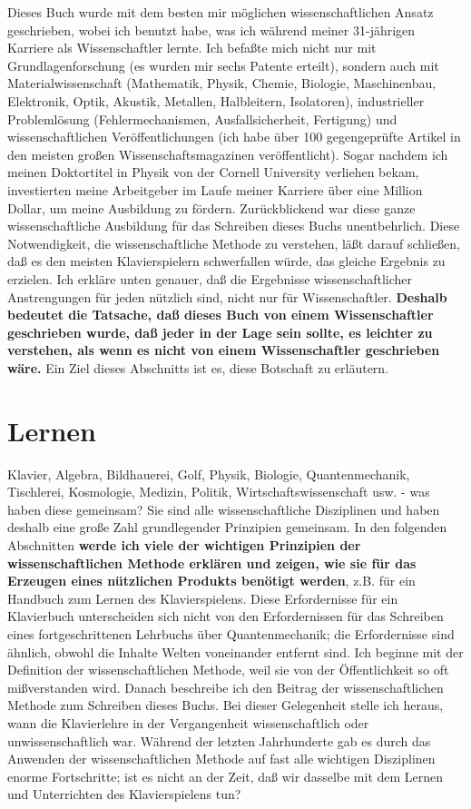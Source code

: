Dieses Buch wurde mit dem besten mir möglichen wissenschaftlichen Ansatz geschrieben, wobei ich benutzt habe, was ich während meiner 31-jährigen Karriere als Wissenschaftler lernte.
Ich befaßte mich nicht nur mit Grundlagenforschung (es wurden mir sechs Patente erteilt), sondern auch mit Materialwissenschaft (Mathematik, Physik, Chemie, Biologie, Maschinenbau, Elektronik, Optik, Akustik, Metallen, Halbleitern, Isolatoren), industrieller Problemlösung (Fehlermechanismen, Ausfallsicherheit, Fertigung) und wissenschaftlichen Veröffentlichungen (ich habe über 100 gegengeprüfte Artikel in den meisten großen Wissenschaftsmagazinen veröffentlicht).
Sogar nachdem ich meinen Doktortitel in Physik von der Cornell University verliehen bekam, investierten meine Arbeitgeber im Laufe meiner Karriere über eine Million Dollar, um meine Ausbildung zu fördern.
Zurückblickend war diese ganze wissenschaftliche Ausbildung für das Schreiben dieses Buchs unentbehrlich.
Diese Notwendigkeit, die wissenschaftliche Methode zu verstehen, läßt darauf schließen, daß es den meisten Klavierspielern schwerfallen würde, das gleiche Ergebnis zu erzielen.
Ich erkläre unten genauer, daß die Ergebnisse wissenschaftlicher Anstrengungen für jeden nützlich sind, nicht nur für Wissenschaftler.
\textbf{Deshalb bedeutet die Tatsache, daß dieses Buch von einem Wissenschaftler geschrieben wurde, daß jeder in der Lage sein sollte, es leichter zu verstehen, als wenn es nicht von einem Wissenschaftler geschrieben wäre.}
Ein Ziel dieses Abschnitts ist es, diese Botschaft zu erläutern.


\section{Lernen}\hypertarget{c3_2b}{}

Klavier, Algebra, Bildhauerei, Golf, Physik, Biologie, Quantenmechanik, Tischlerei, Kosmologie, Medizin, Politik, Wirtschaftswissenschaft usw. - was haben diese gemeinsam?
Sie sind alle wissenschaftliche Disziplinen und haben deshalb eine große Zahl grundlegender Prinzipien gemeinsam.
In den folgenden Abschnitten \textbf{werde ich viele der wichtigen Prinzipien der wissenschaftlichen Methode erklären und zeigen, wie sie für das Erzeugen eines nützlichen Produkts benötigt werden}, z.B. für ein Handbuch zum Lernen des Klavierspielens.
Diese Erfordernisse für ein Klavierbuch unterscheiden sich nicht von den Erfordernissen für das Schreiben eines fortgeschrittenen Lehrbuchs über Quantenmechanik; die Erfordernisse sind ähnlich, obwohl die Inhalte Welten voneinander entfernt sind.
Ich beginne mit der Definition der wissenschaftlichen Methode, weil sie von der Öffentlichkeit so oft mißverstanden wird.
Danach beschreibe ich den Beitrag der wissenschaftlichen Methode zum Schreiben dieses Buchs.
Bei dieser Gelegenheit stelle ich heraus, wann die Klavierlehre in der Vergangenheit wissenschaftlich oder unwissenschaftlich war.
Während der letzten Jahrhunderte gab es durch das Anwenden der wissenschaftlichen Methode auf fast alle wichtigen Disziplinen enorme Fortschritte; ist es nicht an der Zeit, daß wir dasselbe mit dem Lernen und Unterrichten des Klavierspielens tun?

